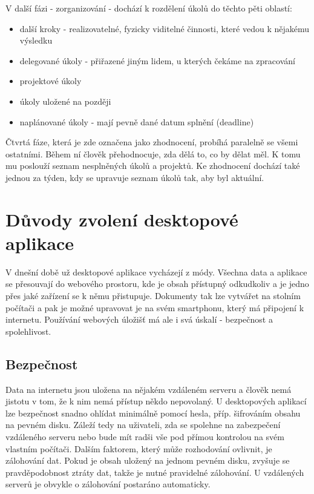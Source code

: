V další fázi - zorganizování - dochází k rozdělení úkolů do těchto pěti oblastí:

\begin{itemize}
\item další kroky - realizovatelné, fyzicky viditelné činnosti, které vedou k nějakému výsledku
\item delegované úkoly - přiřazené jiným lidem, u kterých čekáme na zpracování
\item projektové úkoly
\item úkoly uložené na později
\item naplánované úkoly - mají pevně dané datum splnění (deadline)
\end{itemize}

Čtvrtá fáze, která je zde označena jako zhodnocení, probíhá paralelně se všemi ostatními. Během ní člověk přehodnocuje, zda dělá to, co by dělat měl. K tomu mu poslouží seznam nesplněných úkolů a projektů. Ke zhodnocení dochází také jednou za týden, kdy se upravuje seznam úkolů tak, aby byl aktuální.

\section{Důvody zvolení desktopové aplikace}

V dnešní době už desktopové aplikace vycházejí z módy. Všechna data a aplikace se přesouvají do webového prostoru, kde je obsah přístupný odkudkoliv a je jedno přes jaké zařízení se k němu přistupuje. Dokumenty tak lze vytvářet na stolním počítači a pak je možné upravovat je na svém smartphonu, který má připojení k internetu. Používání webových úložišť má ale i svá úskalí - bezpečnost a spolehlivost.

\subsection{Bezpečnost}

Data na internetu jsou uložena na nějakém vzdáleném serveru a člověk nemá jistotu v tom, že k nim nemá přístup někdo nepovolaný. U desktopových aplikací lze bezpečnost snadno ohlídat minimálně pomocí hesla, příp. šifrováním obsahu na pevném disku. Záleží tedy na uživateli, zda se spolehne na zabezpečení vzdáleného serveru nebo bude mít radši vše pod přímou kontrolou na svém vlastním počítači. Dalším faktorem, který může rozhodování ovlivnit, je zálohování dat. Pokud je obsah uložený na jednom pevném disku, zvyšuje se pravděpodobnost ztráty dat, takže je nutné pravidelné zálohování. U vzdálených serverů je obvykle o zálohování postaráno automaticky. 

